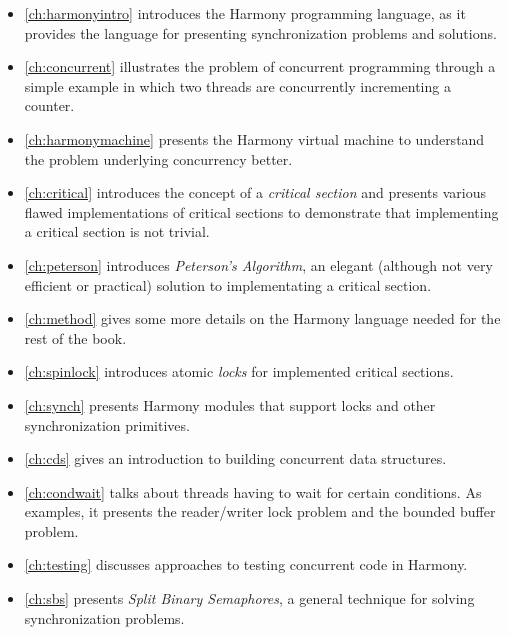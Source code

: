 \documentclass{report}
\begin{document}
\begin{itemize}
\item \autoref{ch:harmonyintro} introduces the Harmony programming
language, as it provides the language for presenting synchronization
problems and solutions.
\item \autoref{ch:concurrent} illustrates the problem of
concurrent programming through a simple example in which two threads
are concurrently incrementing a counter.
\item \autoref{ch:harmonymachine} presents the
Harmony virtual machine to understand the problem
underlying concurrency better.
\item \autoref{ch:critical} introduces the concept of a
\emph{critical section} and presents various flawed implementations
of critical sections to demonstrate that implementing a critical section
is not trivial.
\item \autoref{ch:peterson} introduces \emph{Peterson's Algorithm}, an
elegant (although not very efficient or practical) solution to implementating a critical section.
\item \autoref{ch:method} gives some more details on the Harmony
language needed for the rest of the book.
\item \autoref{ch:spinlock} introduces atomic \emph{locks}
for implemented critical sections.
\item \autoref{ch:synch} presents Harmony modules
that support locks and other synchronization primitives.
\item \autoref{ch:cds} gives an introduction to building concurrent
data structures.
\item \autoref{ch:condwait} talks about threads having to wait for
certain conditions.  As examples, it presents the reader/writer lock
problem and the bounded buffer problem.
\item \autoref{ch:testing} discusses approaches to testing
concurrent code in Harmony.
\item \autoref{ch:sbs} presents \emph{Split Binary Semaphores}, a
general technique for solving synchronization problems.

\end{itemize}
\end{document}
